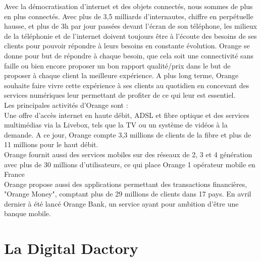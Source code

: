 Avec la démocratisation d'internet et des objets connectés, nous sommes de plus en plus connectés. Avec plus de 3,5 milliards d'internautes, chiffre en perpétuelle hausse, et plus de 3h par jour passées devant l'écran de son téléphone, les milieux de la téléphonie et de l'internet doivent toujours être à l'écoute des besoins de ses clients pour pouvoir répondre à leurs besoins en constante évolution. Orange se donne pour but de répondre à chaque besoin, que cela soit une connectivité sans faille ou bien encore proposer un bon rapport qualité/prix dans le but de proposer à chaque client la meilleure expérience. A plus long terme, Orange souhaite faire vivre cette expérience à ses clients au quotidien en concevant des services numériques leur permettant de profiter de ce qui leur est essentiel. \\
Les principales activités d'Orange sont :\\
Une offre d'accès internet en haute débit, ADSL et fibre optique et des services multimédias via la Livebox, tels que la TV ou un système de vidéos à la demande. A ce jour, Orange compte 3,3 millions de clients de la fibre et plus de 11 millions pour le haut débit.\\
Orange fournit aussi des services mobiles sur des réseaux de 2, 3 et 4 génération avec plus de 30 millions d'utilisateurs, ce qui place Orange 1 opérateur mobile en France\\
Orange propose aussi des applications permettant des transactions financières, "Orange Money", comptant plus de 29 millions de clients dans 17 pays. En avril dernier à été lancé Orange Bank, un service ayant pour ambition d'être une banque mobile.


\section{La Digital Dactory}



